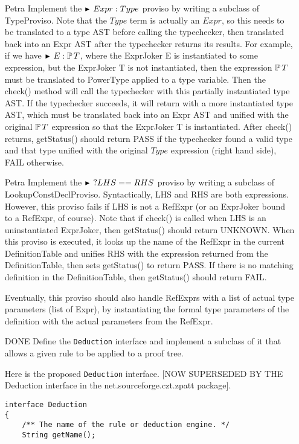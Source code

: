 \documentclass{article}
\newcommand{\proviso}{\raisebox{0.5ex}{${}_{\blacktriangleright}\ $}}%
\begin{document}
\begin{enumerate}
\item [Petra] Implement the $\proviso Expr : Type$ proviso by writing
  a subclass of TypeProviso.
  Note that the $Type$ term is actually an $Expr$, so this
  needs to be translated to a type AST before calling the
  typechecker, then translated back into an Expr AST after the
  typechecker returns its results.  For example, if we have
  $\proviso E : \power T$, where the ExprJoker E is instantiated
  to some expression, but the ExprJoker T is not instantiated,
  then the expression $\power T$ must be translated to PowerType
  applied to a type variable.  Then the check() method will call
  the typechecker with this partially instantiated type AST.
  If the typechecker succeeds, it will return with a more instantiated
  type AST, which must be translated back into an Expr
  AST and unified with the original $\power T$ expression so that
  the ExprJoker T is instantiated.  After check() returns, getStatus()
  should return PASS if the typechecker found a valid type and that
  type unified with the original $Type$ expression (right hand side),
  FAIL otherwise.

\item [Petra] Implement the $\proviso? LHS == RHS$ proviso by writing
  a subclass of LookupConstDeclProviso.
  Syntactically, LHS and RHS are both expressions.  However,
  this proviso fails if LHS is not a RefExpr (or an ExprJoker
  bound to a RefExpr, of course).  Note that if check() is called
  when LHS is an uninstantiated ExprJoker, then getStatus() should
  return UNKNOWN.  When this proviso is executed,
  it looks up the name of the RefExpr in the current DefinitionTable
  and unifies RHS with the expression returned from the DefinitionTable,
  then sets getStatus() to return PASS.
  If there is no matching definition in the DefinitionTable, then
  getStatus() should return FAIL.

  Eventually, this proviso should also handle RefExprs with a list
  of actual type parameters (list of Expr), by instantiating the
  formal type parameters of the definition with the actual parameters
  from the RefExpr.

\item [DONE] Define the \texttt{Deduction} interface and implement a
  subclass of it that allows a given rule to be applied to
  a proof tree.

  Here is the proposed \texttt{Deduction} interface.
  [NOW SUPERSEDED BY THE Deduction interface in the 
  net.sourceforge.czt.zpatt package].
\begin{verbatim}
interface Deduction
{
    /** The name of the rule or deduction engine. */
    String getName();


\end{verbatim}
\end{enumerate}
\end{document}
